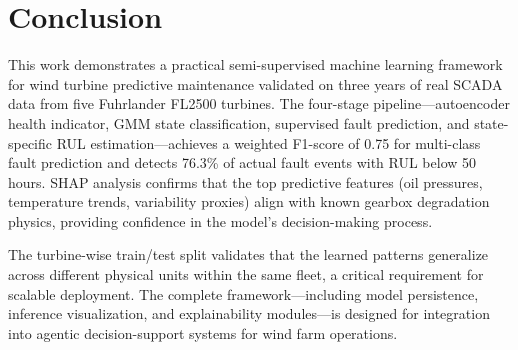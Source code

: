 \documentclass[preprint,12pt]{elsarticle}
\begin{document}
\section{Conclusion}
\label{sec:conclusion}

This work demonstrates a practical semi-supervised machine learning framework for wind turbine predictive maintenance validated on three years of real SCADA data from five Fuhrlander FL2500 turbines. The four-stage pipeline---autoencoder health indicator, GMM state classification, supervised fault prediction, and state-specific RUL estimation---achieves a weighted F1-score of 0.75 for multi-class fault prediction and detects 76.3\% of actual fault events with RUL below 50 hours. SHAP analysis confirms that the top predictive features (oil pressures, temperature trends, variability proxies) align with known gearbox degradation physics, providing confidence in the model's decision-making process.

The turbine-wise train/test split validates that the learned patterns generalize across different physical units within the same fleet, a critical requirement for scalable deployment. The complete framework---including model persistence, inference visualization, and explainability modules---is designed for integration into agentic decision-support systems for wind farm operations.


\end{document}
